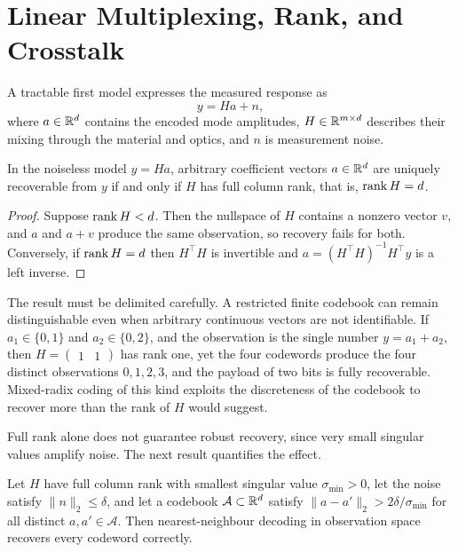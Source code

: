 \section{Linear Multiplexing, Rank, and Crosstalk}\label{sec:linear}

A tractable first model expresses the measured response as
\begin{equation}\label{eq:linear}
y=Ha+n,
\end{equation}
where $a\in\mathbb{R}^{d}$ contains the encoded mode amplitudes, $H\in\mathbb{R}^{m\times d}$ describes their mixing through the material and optics, and $n$ is measurement noise.

\begin{proposition}\label{prop:rank}
In the noiseless model $y=Ha$, arbitrary coefficient vectors $a\in\mathbb{R}^d$ are uniquely recoverable from $y$ if and only if $H$ has full column rank, that is, $\operatorname{rank} H=d$.
\end{proposition}

\begin{proof}
Suppose $\operatorname{rank} H<d$. Then the nullspace of $H$ contains a nonzero vector $v$, and $a$ and $a+v$ produce the same observation, so recovery fails for both. Conversely, if $\operatorname{rank} H=d$ then $H^{\top}H$ is invertible and $a=(H^{\top}H)^{-1}H^{\top}y$ is a left inverse.
\end{proof}

The result must be delimited carefully. A restricted finite codebook can remain distinguishable even when arbitrary continuous vectors are not identifiable. If $a_1\in\{0,1\}$ and $a_2\in\{0,2\}$, and the observation is the single number $y=a_1+a_2$, then $H=\begin{pmatrix}1&1\end{pmatrix}$ has rank one, yet the four codewords produce the four distinct observations $0,1,2,3$, and the payload of two bits is fully recoverable. Mixed-radix coding of this kind exploits the discreteness of the codebook to recover more than the rank of $H$ would suggest.

Full rank alone does not guarantee robust recovery, since very small singular values amplify noise. The next result quantifies the effect.

\begin{proposition}\label{prop:amp}
Let $H$ have full column rank with smallest singular value $\sigma_{\min}>0$, let the noise satisfy $\|n\|_2\le\delta$, and let a codebook $\mathcal A\subset\mathbb{R}^{d}$ satisfy $\|a-a'\|_2>2\delta/\sigma_{\min}$ for all distinct $a,a'\in\mathcal A$. Then nearest-neighbour decoding in observation space recovers every codeword correctly.
\end{proposition}

